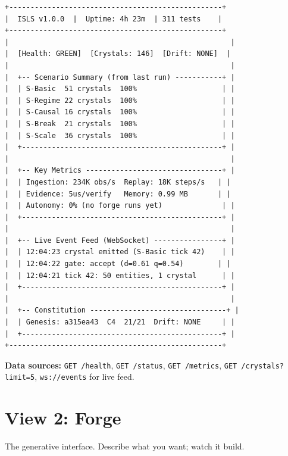 \documentclass[11pt,a4paper,twoside]{article}
\begin{document}
\begin{lstlisting}[title={Dashboard Layout}]
+--------------------------------------------------+
|  ISLS v1.0.0  |  Uptime: 4h 23m  | 311 tests    |
+--------------------------------------------------+
|                                                    |
|  [Health: GREEN]  [Crystals: 146]  [Drift: NONE]  |
|                                                    |
|  +-- Scenario Summary (from last run) -----------+ |
|  | S-Basic  51 crystals  100%                    | |
|  | S-Regime 22 crystals  100%                    | |
|  | S-Causal 16 crystals  100%                    | |
|  | S-Break  21 crystals  100%                    | |
|  | S-Scale  36 crystals  100%                    | |
|  +-----------------------------------------------+ |
|                                                    |
|  +-- Key Metrics --------------------------------+ |
|  | Ingestion: 234K obs/s  Replay: 18K steps/s   | |
|  | Evidence: 5us/verify   Memory: 0.99 MB       | |
|  | Autonomy: 0% (no forge runs yet)              | |
|  +-----------------------------------------------+ |
|                                                    |
|  +-- Live Event Feed (WebSocket) ----------------+ |
|  | 12:04:23 crystal emitted (S-Basic tick 42)    | |
|  | 12:04:22 gate: accept (d=0.61 q=0.54)        | |
|  | 12:04:21 tick 42: 50 entities, 1 crystal      | |
|  +-----------------------------------------------+ |
|                                                    |
|  +-- Constitution --------------------------------+ |
|  | Genesis: a315ea43  C4  21/21  Drift: NONE     | |
|  +-----------------------------------------------+ |
+--------------------------------------------------+
\end{lstlisting}

\textbf{Data sources:} \texttt{GET /health}, \texttt{GET /status},
\texttt{GET /metrics}, \texttt{GET /crystals?limit=5},
\texttt{ws://events} for live feed.


\section{View 2: Forge}\label{sec:forge}

The generative interface. Describe what you want; watch it build.
\end{document}
